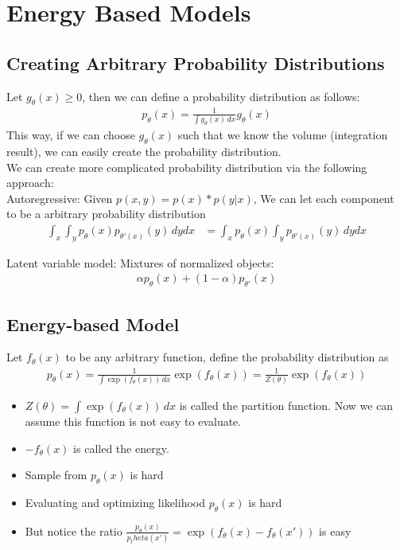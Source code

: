 \chapter{Energy Based Models} 
\section{Creating Arbitrary Probability Distributions} 
Let $g_\theta(x) \geq 0$, then we can define a probability distribution as follows: 
    \begin{align*}
        p_\theta(x) = \frac{1}{\int g_\theta(x) \, dx} g_\theta(x)
    \end{align*}
This way, if we can choose $g_\theta(x)$ such that we know the volume (integration result), we can easily create the probability distribution. \\

We can create more complicated probability distribution via the following approach: \\
Autoregressive: Given $p(x,y) = p(x) * p(y|x)$, We can let each component to be a arbitrary probability distribution 
    \begin{align*}
        \int_x \int_y p_\theta(x) p_{\theta'(x)}(y) \, dydx
        & = \int_x p_\theta(x) \int_y p_{\theta'(x)}(y) \,dy dx
    \end{align*}

Latent variable model: Mixtures of normalized objects: 
    \begin{align*}
        \alpha p_\theta(x) + (1-\alpha)p_{\theta'}(x)
    \end{align*}
    
\section{Energy-based Model} 
Let $f_\theta(x)$ to be any arbitrary function, define the probability distribution as 
    \begin{align*}
        p_\theta(x) = \frac{1}{\int \exp(f_\theta(x)) \, dx}\exp(f_\theta(x)) = \frac{1}{Z(\theta)}\exp(f_\theta(x))
    \end{align*}
    \begin{itemize}
        \item $Z(\theta) = \int \exp(f_\theta(x))\,dx$ is called the partition function. Now we can assume this function is not easy to evaluate. 
        \item $-f_\theta(x)$ is called the energy. 
        \item Sample from $p_\theta(x)$ is hard
        \item Evaluating and optimizing likelihood $p_\theta(x)$ is hard
        \item But notice the ratio $\frac{p_\theta(x)}{p_theta(x')}=\exp(f_\theta(x) - f_\theta(x'))$ is easy
    \end{itemize}
    
